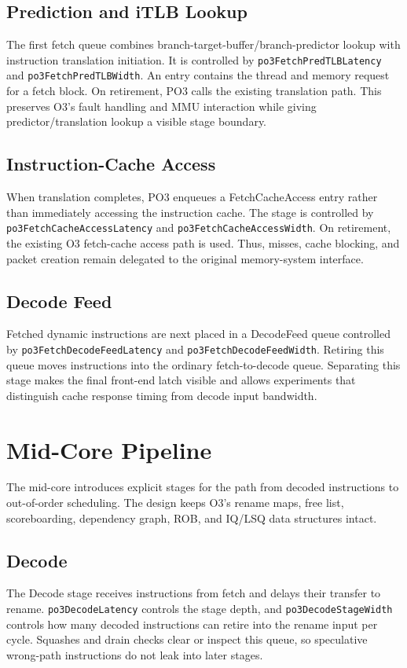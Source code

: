 \documentclass[10pt,twocolumn]{article}
\newcommand{\po}{\textsc{PO3}}
\newcommand{\oo}{\textsc{O3}}
\newcommand{\stage}[1]{\textsf{#1}}
\begin{document}
\subsection{Prediction and iTLB Lookup}
The first fetch queue combines branch-target-buffer/branch-predictor lookup with instruction translation initiation.  It is controlled by \texttt{po3FetchPredTLBLatency} and \texttt{po3FetchPredTLBWidth}.  An entry contains the thread and memory request for a fetch block.  On retirement, \po{} calls the existing translation path.  This preserves \oo{}'s fault handling and MMU interaction while giving predictor/translation lookup a visible stage boundary.

\subsection{Instruction-Cache Access}
When translation completes, \po{} enqueues a \stage{FetchCacheAccess} entry rather than immediately accessing the instruction cache.  The stage is controlled by \texttt{po3FetchCacheAccessLatency} and \texttt{po3FetchCacheAccessWidth}.  On retirement, the existing \oo{} fetch-cache access path is used.  Thus, misses, cache blocking, and packet creation remain delegated to the original memory-system interface.

\subsection{Decode Feed}
Fetched dynamic instructions are next placed in a \stage{DecodeFeed} queue controlled by \texttt{po3FetchDecodeFeedLatency} and \texttt{po3FetchDecodeFeedWidth}.  Retiring this queue moves instructions into the ordinary fetch-to-decode queue.  Separating this stage makes the final front-end latch visible and allows experiments that distinguish cache response timing from decode input bandwidth.

\section{Mid-Core Pipeline}
The mid-core introduces explicit stages for the path from decoded instructions to out-of-order scheduling.  The design keeps \oo{}'s rename maps, free list, scoreboarding, dependency graph, ROB, and IQ/LSQ data structures intact.

\subsection{Decode}
The \stage{Decode} stage receives instructions from fetch and delays their transfer to rename.  \texttt{po3DecodeLatency} controls the stage depth, and \texttt{po3DecodeStageWidth} controls how many decoded instructions can retire into the rename input per cycle.  Squashes and drain checks clear or inspect this queue, so speculative wrong-path instructions do not leak into later stages.
\end{document}
